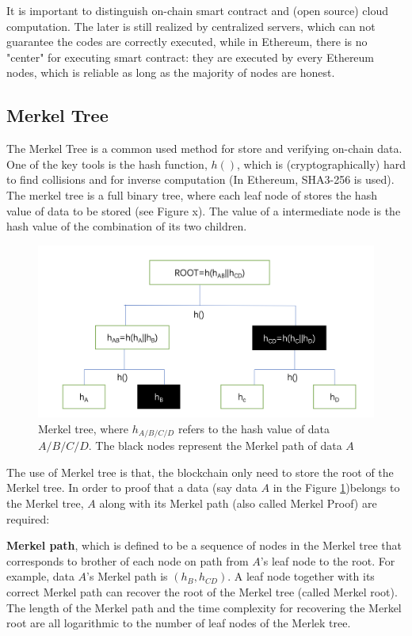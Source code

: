 It is important to distinguish on-chain smart contract and (open source) cloud computation. The later is still realized by centralized servers, which can not guarantee the codes are correctly executed, while in Ethereum, there is no "center" for executing smart contract: they are executed by every Ethereum nodes, which is reliable as long as the majority of nodes are honest.

\subsection{Merkel Tree}
The Merkel Tree is a common used method for store and verifying on-chain data. One of the key tools is the hash function, $h()$, which is (cryptographically) hard to find collisions and for inverse computation (In Ethereum, SHA3-256 is used). The merkel tree is a full binary tree, where each leaf node of stores the hash value of data to be stored (see Figure x). The value of a intermediate node is the hash value of the combination of its two children. 
\begin{figure}
	\centering
	\label{fig:merkel}
	\includegraphics[width=1.1\textwidth]{merkel.png}
	\caption{Merkel tree, where $h_{A/B/C/D}$ refers to the hash value of data $A/B/C/D$. The black nodes represent the Merkel path of data $A$}
\end{figure}
The use of Merkel tree is that, the blockchain only need to store the root of the Merkel tree. In order to proof that a data (say data $A$ in the Figure \ref{fig:merkel})belongs to the Merkel tree, $A$ along with its Merkel path (also called Merkel Proof) are required:

\textbf{Merkel path}, which is defined to be a sequence of nodes in the Merkel tree that corresponds to brother of each node on path from  $A$'s leaf node to the root. For example, data $A$'s Merkel path is $(h_B,h_{CD})$. A leaf node together with its correct Merkel path can recover the root of the Merkel tree (called Merkel root). The length of the Merkel path and the time complexity for recovering the Merkel root are all logarithmic to the number of leaf nodes of the Merlek tree.
